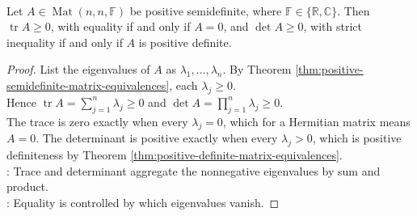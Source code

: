 \begin{proposition} \label{prop:trace-determinant-positive-semidefinite} \\
Let $A\in\operatorname{Mat}(n,n,\mathbb{F})$ be positive semidefinite, where $\mathbb{F}\in\{\mathbb{R},\mathbb{C}\}$. Then $\operatorname{tr}A\geq0$, with equality if and only if $A=0$, and $\det A\geq0$, with strict inequality if and only if $A$ is positive definite.
\begin{proof}
List the eigenvalues of $A$ as $\lambda_1,\ldots,\lambda_n$. By Theorem \ref{thm:positive-semidefinite-matrix-equivalences}, each $\lambda_j\geq0$.\\
Hence $\operatorname{tr}A=\sum\limits_{j=1}^{n}\lambda_j\geq0$ and $\det A=\prod\limits_{j=1}^{n}\lambda_j\geq0$.\\
The trace is zero exactly when every $\lambda_j=0$, which for a Hermitian matrix means $A=0$. The determinant is positive exactly when every $\lambda_j>0$, which is positive definiteness by Theorem \ref{thm:positive-definite-matrix-equivalences}.\\
: Trace and determinant aggregate the nonnegative eigenvalues by sum and product.\\
: Equality is controlled by which eigenvalues vanish.
\end{proof}
\end{proposition}

